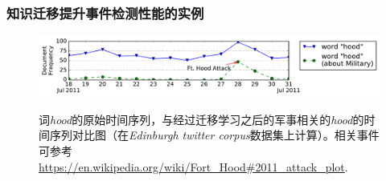 \begin{frame}
\frametitle{知识迁移提升事件检测性能的实例}	
\begin{figure}[h]
		\setlength{\abovecaptionskip}{0.cm}
        \setlength{\belowcaptionskip}{0.cm}
        \centering
	\caption{词\textit{hood}的原始时间序列，与经过迁移学习之后的军事相关的\textit{hood}的时间序列对比图（在\textit{Edinburgh twitter corpus}数据集上计算）。相关事件可参考\url{https://en.wikipedia.org/wiki/Fort_Hood\#2011_attack_plot}.}
        \includegraphics[width=1.0\columnwidth]{img/hood.pdf}
        \label{fig:hood}
\end{figure}

\begin{figure}[h]
	\setlength{\abovecaptionskip}{0.cm}
	\setlength{\belowcaptionskip}{0.cm}
	\centering
\end{figure}
\end{frame}

